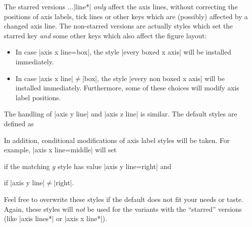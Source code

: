 \begin{pgfplotskeylist}
    The starred versions $\dotsc$|line*| \emph{only} affect the axis lines,
    without correcting the positions of axis labels, tick lines or other keys
    which are (possibly) affected by a changed axis line. The non-starred
    versions are actually styles which set the starred key \emph{and} some
    other keys which also affect the figure layout:
    \begin{itemize}
        \item In case |axis x line=box|, the style |every boxed x axis| will
            be installed immediately.
        \item In case |axis x line|$\neq$|box|, the style
            |every non boxed x axis| will be installed immediately.
            Furthermore, some of these choices will modify axis label
            positions.
    \end{itemize}
    The handling of |axis y line| and |axis z line| is similar. The default
    styles are defined as
\begin{codeexample}
\end{codeexample}
    In addition, conditional modifications of axis label styles will be taken.
    For example, |axis x line=middle| will set
\begin{codeexample}
\end{codeexample}
    if the matching $y$ style has value |axis y line=right| and
\begin{codeexample}
\end{codeexample}
    if |axis y line|$\neq$|right|.

    Feel free to overwrite these styles if the default does not fit your needs
    or taste. Again, these styles will \emph{not} be used for the variants with the ``starred'' versions (like |axis lines*| or |axis x line*|).

\begin{codeexample}[]
\end{codeexample}


\end{pgfplotskeylist}
